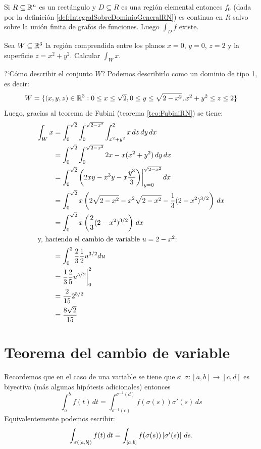 Si $ R \subseteq \mathbb{R}^n $ es un rect\'angulo y $ D \subseteq R $ es una regi\'on elemental entonces $ f_0 $ (dada por la definici\'on \ref{def:IntegralSobreDominioGeneralRN}) es continua en $ R $ salvo sobre la uni\'on finita de grafos de funciones. Luego $ \int_D f $ existe.

\begin{ejemplo}
Sea $ W \subseteq \mathbb{R}^3 $ la regi\'on comprendida entre los planos $x=0 $, $ y=0 $, $z=2$ y la superficie $ z=x^2+y^2 $. Calcular $\int_W x $. 

\begin{solucion}
?`C\'omo describir el conjunto $ W $? Podemos describirlo como un
dominio de tipo 1, es decir:
\[
    W = \{ (x,y,z) \in \mathbb{R}^3: 0 \leq x \leq \sqrt{2}, 0 \leq y \leq \sqrt{2-x^2},
    x^2 + y^2 \leq z \leq 2 \}
\]
Luego, gracias al teorema de Fubini (teorema \ref{teo:FubiniRN})
se tiene:
\begin{align*}
\int_W x &=
    \int_0^{\sqrt{2}} \int_0^{\sqrt{2-x^2}}
        \int_{x^2+y^2}^2 x \, dz \, dy \, dx \\
    &= \int_0^{\sqrt{2}} \int_0^{\sqrt{2-x^2}}
        2x - x(x^2+y^2) \, dy \, dx \\
    &= \int_0^{\sqrt{2}} \left(2xy - x^3 y - x \frac{y^3}{3}\right)
        \biggr |_{y=0}^{\sqrt{2-x^2}} \, dx \\
    &= \int_0^{\sqrt{2}}
        x\left(2 \sqrt{2-x^2} - x^2 \sqrt{2-x^2} - \frac{1}{3} (2-x^2)^{3/2}\right)
        \, dx \\
    &= \int_0^{\sqrt{2}} x\left(\frac{2}{3} (2-x^2)^{3/2}\right) \, dx \\
\intertext{y, haciendo el cambio de variable $ u=2-x^2 $:}
    &= \int_0^2 \frac{2}{3} \frac{1}{2} u^{3/2} du \\
    &= \frac{1}{3} \frac{2}{5} u^{5/2} \biggr |_0^2 \\
    &= \frac{2}{15} 2^{5/2} \\
    &= \frac{8 \sqrt{2}}{15}
\end{align*}
\end{solucion}
\end{ejemplo}

\section{Teorema del cambio de variable}
Recordemos que en el caso de una variable se tiene que si $\sigma:[a,b] \to [c,d] $ es biyectiva (m\'as algunas hip\'otesis adicionales) entonces
    \[ \int_a^b f(t) \, dt =
    \int_{\sigma^{-1}(c)}^{\sigma^{-1}(d)}
    f(\sigma(s)) \sigma'(s) \, ds \]
Equivalentemente podemos escribir:
    \[
        \int_{\sigma([a,b])} f(t) \, dt =
        \int_{[a,b]} f(\sigma(s)) \left\lvert\sigma'(s)\right\rvert \, ds.
    \]

